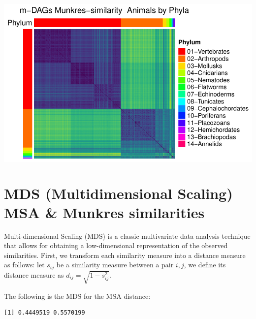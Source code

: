 \documentclass[
  letterpaper,
  DIV=11,
  numbers=noendperiod]{scrreprt}
\newenvironment{Shaded}{}{}
\newcommand{\AttributeTok}[1]{\textcolor[rgb]{0.78,0.47,0.87}{#1}}
\newcommand{\ConstantTok}[1]{\textcolor[rgb]{0.82,0.60,0.40}{#1}}
\newcommand{\DecValTok}[1]{\textcolor[rgb]{0.82,0.60,0.40}{#1}}
\newcommand{\DocumentationTok}[1]{\textcolor[rgb]{0.64,0.20,0.25}{#1}}
\newcommand{\FunctionTok}[1]{\textcolor[rgb]{0.38,0.69,0.94}{#1}}
\newcommand{\NormalTok}[1]{\textcolor[rgb]{0.67,0.70,0.75}{#1}}
\newcommand{\OtherTok}[1]{\textcolor[rgb]{0.15,0.68,0.38}{#1}}
\newcommand{\SpecialCharTok}[1]{\textcolor[rgb]{0.34,0.71,0.76}{#1}}
\begin{document}
\includegraphics[width=1\textwidth,height=\textheight]{m_DAGs_similarity_files/figure-pdf/heatmaps-4.pdf}

\section{MDS (Multidimensional Scaling) MSA \& Munkres
similarities}\label{mds-multidimensional-scaling-msa-munkres-similarities}

Multi-dimensional Scaling (MDS) is a classic multivariate data analysis
technique that allows for obtaining a low-dimensional representation of
the observed similarities. First, we transform each similarity measure
into a distance measure as follows: let \(s_{ij}\) be a similarity
measure between a pair \(i,j\), we define its distance measure as
\(d_{ij}=\sqrt{1-s_{ij}^2}\).

The following is the MDS for the MSA distance:

\begin{Shaded}
\end{Shaded}

\begin{verbatim}
[1] 0.4449519 0.5570199
\end{verbatim}
\end{document}
